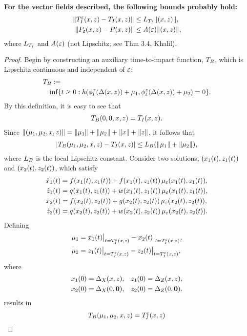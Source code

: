 \documentclass[twocolumn]{article}
\begin{document}
\begin{lemma}
  \label{lemma:hard-one}
  {\bf For the vector fields described, the following bounds probably hold:}
  \begin{align}
    \nonumber
    \| T_{I}^{\varepsilon}(x, z) - T_{I}(x, z) \| &\leq L_{T_{I}} \|(x, z)\|,\\
    \nonumber
    \| P_{\varepsilon}(x, z) - P(x, z) \| &\leq A(\varepsilon) \|(x, z)\|,
  \end{align}
  where $L_{T_{I}}$ and $A(\varepsilon)$ (not Lipschitz; see Thm 3.4, Khalil).
\end{lemma}
\begin{proof}
  Begin by constructing an auxiliary time-to-impact function, $T_{B}$, which is Lipschitz continuous and independent of $\varepsilon$:
  \begin{align}
    \lefteqn{\TB :=}\\
    \nonumber
    &&\inf \{t \geq 0 : h(\flowtx(\Delta\argsxz) + \mu_{1}, \flowtz(\Delta\argsxz) + \mu_{2}) = 0 \}.
  \end{align}
  By this definition, it is easy to see that
  \begin{align}
    T_{B}(0, 0, x, z) = T_{I}(x, z).
  \end{align}
  Since $\|(\mu_{1}, \mu_{2}, x, z)\| = \|\mu_{1}\| + \|\mu_{2}\| + \|x\| + \|z\|$, it follows that
  \begin{align}
    | T_{B}(\mu_{1}, \mu_{2}, x, z) - T_{I}(x, z)| \leq L_{B} (\| \mu_{1} \| + \| \mu_{2} \|),
  \end{align}
  where $L_{B}$ is the local Lipschitz constant. Consider two solutions, $(x_{1}(t), z_{1}(t))$ and  $(x_{2}(t), z_{2}(t))$, which satisfy
  \begin{align}
    \nonumber
    {\dot {x}}_{1}(t) &= f(x_{1}(t), z_{1}(t)) + f(x_{1}(t), z_{1}(t)) \, \mu_{\varepsilon}(x_{1}(t), z_{1}(t)),\\
    \nonumber
    {\dot {z}}_{1}(t) &= q(x_{1}(t), z_{1}(t)) + w(x_{1}(t), z_{1}(t)) \, \mu_{\varepsilon}(x_{1}(t), z_{1}(t)),\\
    \nonumber
    {\dot {x}}_{2}(t) &= f(x_{2}(t), z_{2}(t)) + g(x_{2}(t), z_{2}(t)) \, \mu_{\varepsilon}(x_{2}(t), z_{2}(t)),\\
    {\dot {z}}_{2}(t) &= q(x_{2}(t), z_{2}(t)) + w(x_{2}(t), z_{2}(t)) \, \mu_{\varepsilon}(x_{2}(t), z_{2}(t)).
  \end{align}
  Defining
  \begin{align}
    \nonumber
    \mu_{1} &= x_{1}(t)\big|_{t = T_{I}^{\varepsilon}(x, z)} - x_{2}(t)\big|_{t = T_{I}^{\varepsilon}(x, z)},\\
    \mu_{2} &= z_{1}(t)\big|_{t = T_{I}^{\varepsilon}(x, z)} - z_{2}(t)\big|_{t = T_{I}^{\varepsilon}(x, z)},
  \end{align}
  where
  \begin{align}
    \nonumber
    x_{1}(0) &= \Delta_{X}(x, z),& z_{1}(0) &= \Delta_{Z}(x, z),\\
    x_{2}(0) &= \Delta_{X}(0, {\mathbf 0}),& z_{2}(0) &= \Delta_{Z}(0, {\mathbf 0}).
  \end{align}
  results in
  \begin{align}
    T_{B}(\mu_{1}, \mu_{2}, x, z) = T_{I}^{\varepsilon}(x, z)
  \end{align}


\end{proof}
\end{document}
